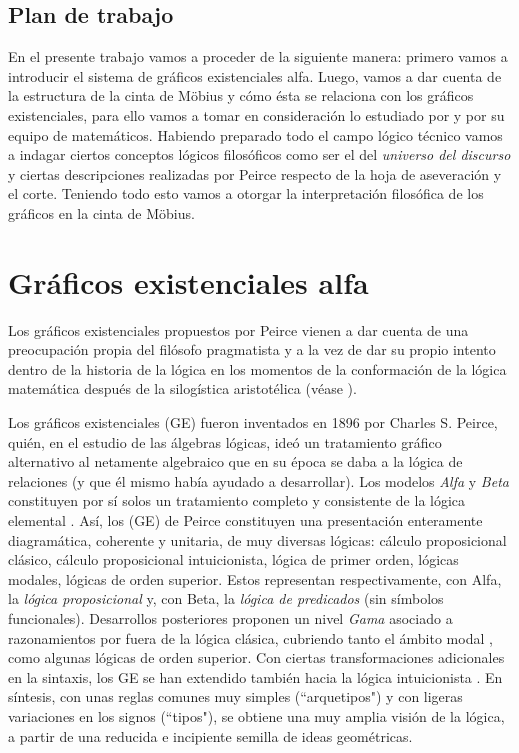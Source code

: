 \documentclass[
	fontsize=10pt, %
	twoside=false, %
	secnumdepth=1, %
	abstract=true, %
]{kaohandt}
\begin{document}
\subsection{Plan de trabajo} %
\label{sub:Plan de trabajo}
En el presente trabajo vamos a proceder de la siguiente manera: primero vamos a introducir el sistema de gráficos existenciales alfa. Luego, vamos a dar cuenta de la estructura de la cinta de Möbius y cómo ésta se relaciona con los gráficos existenciales, para ello vamos a tomar en consideración lo estudiado por \cite{oostra2022} y por su equipo de matemáticos. Habiendo preparado todo el campo lógico técnico vamos a indagar ciertos conceptos lógicos filosóficos como ser el del \textit{universo del discurso} y ciertas descripciones realizadas por Peirce respecto de la hoja de aseveración y el corte. Teniendo todo esto vamos a otorgar la interpretación filosófica de los gráficos en la cinta de Möbius.



\section{Gráficos existenciales alfa}

Los gráficos existenciales propuestos por Peirce vienen a dar cuenta de una preocupación propia del filósofo pragmatista y a la vez de dar su propio intento dentro de la historia de la lógica en los momentos de la conformación de la lógica matemática después de la silogística aristotélica (véase ).

Los gráficos existenciales (GE) fueron inventados en 1896 por Charles S. Peirce, quién, en el estudio de las álgebras lógicas, ideó un tratamiento gráfico alternativo al netamente algebraico que en su época se daba a la lógica de relaciones (y que él mismo había ayudado a desarrollar). Los modelos \textit{Alfa} y \textit{Beta} constituyen por sí solos un tratamiento completo y consistente de la lógica elemental . Así, los (GE) de Peirce constituyen una presentación enteramente diagramática, coherente y unitaria, de muy diversas lógicas: cálculo proposicional clásico, cálculo proposicional intuicionista, lógica de primer orden, lógicas modales, lógicas de orden superior. Estos representan respectivamente, con Alfa, la \textit{lógica proposicional} y, con Beta, la \textit{lógica de predicados} (sin símbolos funcionales). Desarrollos posteriores proponen un nivel \textit{Gama} asociado a razonamientos por fuera de la lógica clásica, cubriendo tanto el ámbito modal , como algunas lógicas de orden superior. Con ciertas transformaciones adicionales en la sintaxis, los GE se han extendido también hacia la lógica intuicionista . En síntesis, con unas reglas comunes muy simples (``arquetipos") y con ligeras variaciones en los signos (``tipos"), se obtiene una muy amplia visión de la lógica, a partir de una reducida e incipiente semilla de ideas geométricas.
\end{document}

